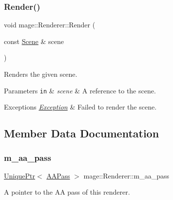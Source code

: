 \subsubsection{\texorpdfstring{Render()}{Render()}}
{\footnotesize\ttfamily void mage\+::\+Renderer\+::\+Render (\begin{DoxyParamCaption}\item[{const \hyperlink{classmage_1_1_scene}{Scene} \&}]{scene }\end{DoxyParamCaption})}

Renders the given scene.


\begin{DoxyParams}[1]{Parameters}
\mbox{\tt in}  & {\em scene} & A reference to the scene. \\
\hline
\end{DoxyParams}

\begin{DoxyExceptions}{Exceptions}
{\em \hyperlink{classmage_1_1_exception}{Exception}} & Failed to render the scene. \\
\hline
\end{DoxyExceptions}


\subsection{Member Data Documentation}
\hypertarget{classmage_1_1_renderer_a275986047921b355d94b1a7111df6665}{}\label{classmage_1_1_renderer_a275986047921b355d94b1a7111df6665} 
\subsubsection{\texorpdfstring{m\+\_\+aa\+\_\+pass}{m\_aa\_pass}}
{\footnotesize\ttfamily \hyperlink{namespacemage_a3316d7143a973e37adf1110f2e80ca31}{Unique\+Ptr}$<$ \hyperlink{classmage_1_1_a_a_pass}{A\+A\+Pass} $>$ mage\+::\+Renderer\+::m\+\_\+aa\+\_\+pass\hspace{0.3cm}{\ttfamily [private]}}

A pointer to the AA pass of this renderer. \hypertarget{classmage_1_1_renderer_a21db5f4d584b3325911d132d0022b856}{}\label{classmage_1_1_renderer_a21db5f4d584b3325911d132d0022b856} 
